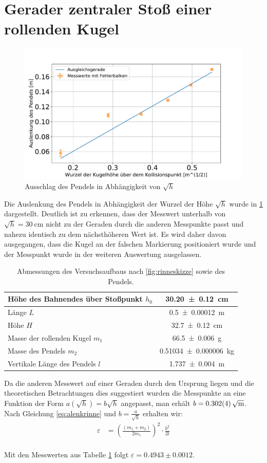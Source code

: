 \section[Rollende Kugel]{Gerader zentraler Stoß einer rollenden Kugel}



\begin{figure}[h!]
	\centering
	\includegraphics[width=0.7\linewidth]{res/Rinne}
	\caption{Ausschlag des Pendels in Abhängigkeit von $\sqrt{h}$}
	\label{fig:rinne}
\end{figure}

Die Auslenkung des Pendels in Abhängigkeit der Wurzel der Höhe $\sqrt{h}$ wurde in \cref{fig:rinne} dargestellt. Deutlich ist zu erkennen, dass der Messwert unterhalb von $\sqrt{h}=\SI{30}{\centi\metre}$ nicht zu der Geraden durch die anderen Messpunkte passt und nahezu identisch zu dem nächsthöheren Wert ist. Es wird daher davon ausgegangen, dass die Kugel an der falschen Markierung positioniert wurde und der Messpunkt wurde in der weiteren Auswertung ausgelassen.
\begin{table}
	\caption{Abmessungen des Versuchsaufbaus nach \cref{fig:rinneskizze} sowie des Pendels.}

\begin{tabular}{|l|c|}
	\hline 
	Höhe des Bahnendes über Stoßpunkt $h_0$ & \SI{30.20+-0.12}{cm}  \\ 
	\hline 
	Länge $L$ & \SI{0.5+-0.00012}{\metre}  \\ 
		\hline 
	Höhe $H$&  \SI{32.7+-0.12}{\centi \meter}\\ 
	\hline
	Masse der rollenden Kugel $m_1$& \SI{66.5 \pm 0.006}{\gram}  \\ 
	\hline 
	Masse des Pendels $m_2$ & \SI{0.51034+-0.000006}{\kilogram} \\  
	\hline
	Vertikale Länge des Pendels $l$ & \SI{1.737+-0.004}{\metre}  \\ 
	\hline 
\end{tabular} 
\label{tab:messwrinne}
\end{table}
Da die anderen Messwert auf einer Geraden durch den Ursprung liegen und die theoretischen Betrachtungen dies suggestiert wurden die Messpunkte an eine Funktion der Form $a(\sqrt{h})=b \sqrt{h}$ angepasst, man erhält $b=\SI{0.302+-0.004}{\sqrt{\metre}}$. Nach Gleichung \ref{eq:alenkrinne} und $b=\frac{a}{\sqrt{h}}$ erhalten wir:
\begin{align}
\varepsilon&=\left( \frac{(m_1+m_2)}{2m_1} \right) ^2 \cdot \frac{b^2}{2l}\\
\end{align}

Mit den Messwerten aus Tabelle \ref{tab:messwrinne} folgt $\varepsilon = 0.4943 \pm 0.0012$.














